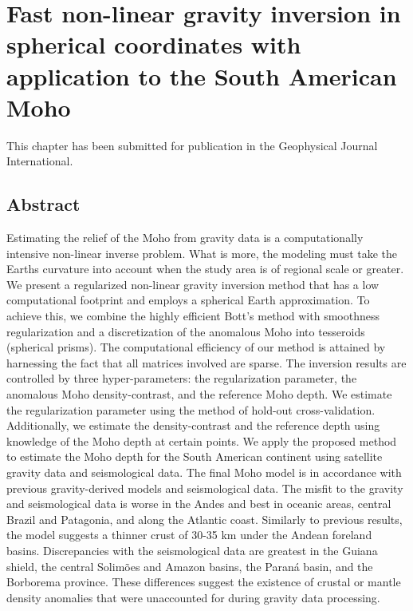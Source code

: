 \chapter{Fast non-linear gravity inversion in spherical coordinates with
         application to the South American Moho}
\label{chap:moho}

This chapter has been submitted for publication in the Geophysical Journal
International.

\section{Abstract}

Estimating the relief of the Moho from gravity data is a computationally
intensive non-linear inverse problem.
What is more, the modeling must take the Earths curvature into account when
the study area is of regional scale or greater.
We present a regularized non-linear gravity inversion method that has a low
computational footprint and employs a spherical Earth approximation.
To achieve this, we combine the highly efficient Bott's method with
smoothness regularization and a discretization of the anomalous Moho into
tesseroids (spherical prisms).
The computational efficiency of our method is attained by harnessing the
fact that all matrices involved are sparse.
The inversion results are controlled by three hyper-parameters: the
regularization parameter, the anomalous Moho density-contrast, and the
reference Moho depth.
We estimate the regularization parameter using the method of hold-out
cross-validation.
Additionally, we estimate the density-contrast and the reference depth
using knowledge of the Moho depth at certain points.
We apply the proposed method to estimate the Moho depth for the South
American continent using satellite gravity data and seismological data.
The final Moho model is in accordance with previous gravity-derived models
and seismological data.
The misfit to the gravity and seismological data is worse in the Andes and
best in oceanic areas, central Brazil and Patagonia, and along the Atlantic
coast.
Similarly to previous results, the model suggests a thinner crust of 30-35
km under the Andean foreland basins.
Discrepancies with the seismological data are greatest in the Guiana
shield, the central Solimões and Amazon basins, the Paraná basin, and the
Borborema province.
These differences suggest the existence of crustal or mantle density
anomalies that were unaccounted for during gravity data processing.


